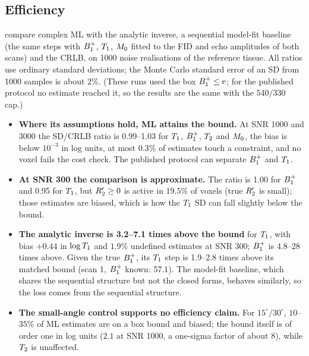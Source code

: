\subsection{Efficiency}

 compare complex ML with the analytic inverse, a sequential
model-fit baseline (the same steps with $B_1^{+}$, $T_1$, $M_0$ fitted to the FID and echo
amplitudes of both scans) and the CRLB, on 1000 noise realisations of the reference tissue.
All ratios use ordinary standard deviations; the Monte Carlo standard error of an SD from
1000 samples is about $2\%$. (These runs used the box $B_1^{+}\le\mathrm{e}$; for the published protocol no
estimate reached it, so the results are the same with the $540/330$ cap.)



\begin{itemize}
\item \textbf{Where its assumptions hold, ML attains the bound.} At SNR 1000 and 3000 the
  SD/CRLB ratio is 0.99--1.03 for $T_1$, $B_1^{+}$, $T_2$ and $M_0$, the bias is below $10^{-3}$ in
  log units, at most $0.3\%$ of estimates touch a constraint, and no voxel fails the cost
  check. The published protocol can separate $B_1^{+}$ and $T_1$.
\item \textbf{At SNR 300 the comparison is approximate.} The ratio is 1.00 for $B_1^{+}$ and 0.95
  for $T_1$, but $R_2'\ge0$ is active in $19.5\%$ of voxels (true $R_2'$ is small); those estimates
  are biased, which is how the $T_1$ SD can fall slightly below the bound.
\item \textbf{The analytic inverse is 3.2--7.1 times above the bound} for $T_1$, with bias
  $+0.44$ in $\log T_1$ and $1.9\%$ undefined estimates at SNR 300; $B_1^{+}$ is 4.8--28 times above.
  Given the true $B_1^{+}$, its $T_1$ step is 1.9--2.8 times above its matched bound (scan 1,
  $B_1^{+}$ known: 57.1). The model-fit baseline, which shares the sequential structure but not
  the closed forms, behaves similarly, so the loss comes from the sequential structure.
\item \textbf{The small-angle control supports no efficiency claim.} For $15^\circ/30^\circ$,
  $10$--$35\%$ of ML estimates are on a box bound and biased; the bound itself is of order one
  in log units ($2.1$ at SNR 1000, a one-sigma factor of about 8), while $T_2$ is unaffected.
\end{itemize}
